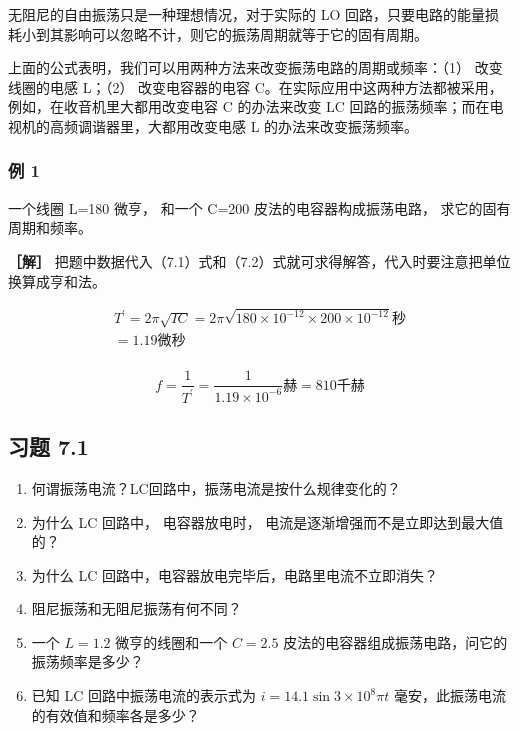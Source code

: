 无阻尼的自由振荡只是一种理想情况，对于实际的 LO
回路，只要电路的能量损耗小到其影响可以忽略不计，则它的振荡周期就等于它的固有周期。

上面的公式表明，我们可以用两种方法来改变振荡电路的周期或频率：（1）
改变线圈的电感 L；（2） 改变电容器的电容
C。在实际应用中这两种方法都被采用，例如，在收音机里大都用改变电容 C
的办法来改变 LC 回路的振荡频率；而在电视机的高频调谐器里，大都用改变电感
L 的办法来改变振荡频率。

\subsubsection{例 1}\label{ux4f8b-1-5}

一个线圈 L=180 微亨， 和一个 C=200 皮法的电容器构成振荡电路，
求它的固有周期和频率。

\textbf{［解］}
把题中数据代入（7.1）式和（7.2）式就可求得解答，代入时要注意把单位换算成亨和法。

\[
\begin{array}{l} T^{\prime} = 2 \pi \sqrt{I C} = 2 \pi \sqrt{180 \times 10^{- 12} \times 200 \times 10^{- 12}} \text{秒} \\ = 1.19 \text{微秒} \\ \end{array}
\]

\[
f = \frac{1}{T^{\prime}} = \frac{1}{1.19 \times 10^{- 6}} \text{赫} = 810 \text{千赫}
\]

\subsection{习题 7.1}\label{ux4e60ux9898-7.1}

\begin{enumerate}
\def\labelenumi{\arabic{enumi}.}
\item
  何谓振荡电流？LC回路中，振荡电流是按什么规律变化的？
\item
  为什么 LC 回路中， 电容器放电时，
  电流是逐渐增强而不是立即达到最大值的？
\item
  为什么 LC 回路中，电容器放电完毕后，电路里电流不立即消失？
\item
  阻尼振荡和无阻尼振荡有何不同？
\item
  一个 \(L = 1.2\) 微亨的线圈和一个 \(C = 2.5\)
  皮法的电容器组成振荡电路，问它的振荡频率是多少？
\item
  已知 LC 回路中振荡电流的表示式为 \(i=14.1\sin3\times10^{8}\pi t\)
  毫安，此振荡电流的有效值和频率各是多少？
\end{enumerate}

